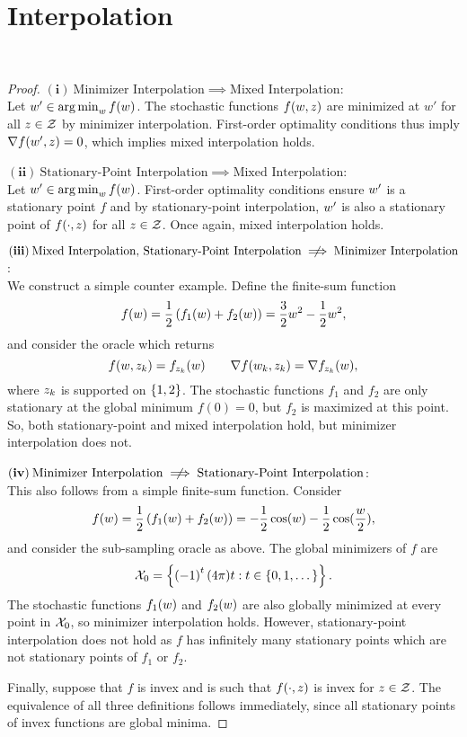 \section{Interpolation}~\label{app:interpolation}

\interpRelationships*
\begin{proof}\hfill \break
    \noindent \((\mathbf{i})\: \text{Minimizer Interpolation} \implies \text{Mixed Interpolation} \): \\
    Let \( w' \in \mathop{\rm arg\,min}_w f(w) \).
    The stochastic functions \( f(w, z) \) are minimized at \( w'  \) for all \( z \in \mathcal{Z} \) by minimizer interpolation.
    First-order optimality conditions thus imply \( \nabla f(w', z) = 0 \), which implies mixed interpolation holds. \hfill \break

    \noindent \( (\mathbf{ii}) \: \text{Stationary-Point Interpolation} \implies \text{Mixed Interpolation} \): \\
    Let \( w' \in \mathop{\rm arg\,min}_w f(w) \).
    First-order optimality conditions ensure \( w' \) is a stationary point \( f \) and by stationary-point interpolation, \( w' \) is also a stationary point of \( f(\cdot, z) \) for all \( z \in \mathcal{Z} \).
    Once again, mixed interpolation holds.\hfill \break

\noindent    \(  (\mathbf{iii}) \:\text{Mixed Interpolation, Stationary-Point Interpolation} \centernot \implies \text{Minimizer Interpolation} \): \\
    We construct a simple counter example.
    Define the finite-sum function
    \[ f(w) = \frac 1 2 \left(f_1(w) + f_2(w)\right) = \frac{3}{2}w^2 - \frac 1 2w^2, \]
    and consider the oracle \oracle{} which returns
    \[ f(w, z_{k}) = f_{z_{k}}(w) \quad \quad \nabla f(w_k, z_{k}) = \nabla f_{z_{k}}(w), \] 
    where \( z_{k} \) is supported on \( \left\{1,2\right\} \).
    The stochastic functions \( f_1 \) and \( f_2 \) are only stationary at the global minimum \( f(0) = 0 \), but \( f_2 \) is maximized at this point.
    So, both stationary-point and mixed interpolation hold, but minimizer interpolation does not.\hfill \break

\noindent    \( (\mathbf{iv}) \: \text{Minimizer Interpolation} \centernot \implies \text{Stationary-Point Interpolation} \): \\
    This also follows from a simple finite-sum function.
    Consider
    \[ f(w) = \frac 1 2 \left(f_1(w) + f_2(w)\right) = -\frac 1 2 \cos(w) - \frac 1 2 \cos(\frac{w}{2}), \]
    and consider the sub-sampling oracle \oracle{} as above.
    The global minimizers of \( f \) are 
    \[ \mathcal{X}_0 = \left\{\left(-1\right)^{t} (4\pi) t : t \in \left\{0,1, \dots \right\}\right\}. \]
    The stochastic functions \( f_1(w) \) and \( f_2(w) \) are also globally minimized at every point in \( \mathcal{X}_0 \), so minimizer interpolation holds.
    However, stationary-point interpolation does not hold as \( f \) has infinitely many stationary points which are not stationary points of \( f_1 \) or \( f_2 \). \hfill \break

    Finally, suppose that \( f \) is invex and \oracle{} is such that \( f(\cdot, z) \) is invex for \( z \in \mathcal{Z} \).
    The equivalence of all three definitions follows immediately, since all stationary points of invex functions are global minima.
\end{proof}

